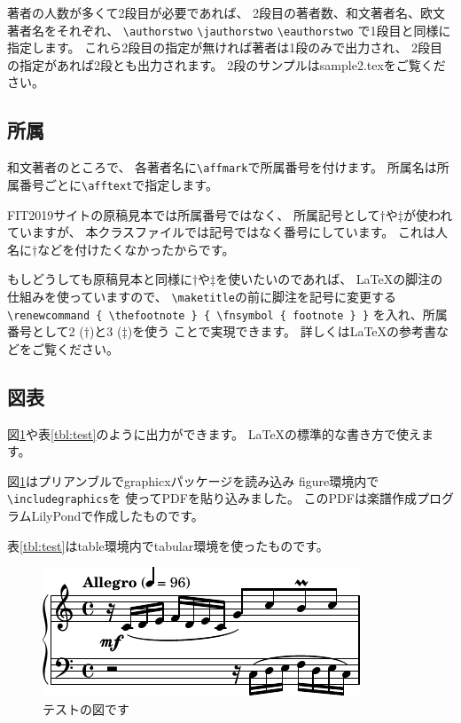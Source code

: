 \documentclass{FITpaper}
\begin{document}
著者の人数が多くて2段目が必要であれば、
2段目の著者数、和文著者名、欧文著者名をそれぞれ、
\texttt{\textbackslash authorstwo}
\texttt{\textbackslash jauthorstwo}
\texttt{\textbackslash eauthorstwo}
で1段目と同様に指定します。
これら2段目の指定が無ければ著者は1段のみで出力され、
2段目の指定があれば2段とも出力されます。
2段のサンプルはsample2.texをご覧ください。

\subsection{所属}

和文著者のところで、
各著者名に\texttt{\textbackslash af\mbox{}fmark}で所属番号を付けます。
所属名は所属番号ごとに\texttt{\textbackslash af\mbox{}ftext}で指定します。

FIT2019サイトの原稿見本では所属番号ではなく、
所属記号として$\dag$や$\ddag$が使われていますが、
本クラスファイルでは記号ではなく番号にしています。
これは人名に$\dag$などを付けたくなかったからです。

もしどうしても原稿見本と同様に$\dag$や$\ddag$を使いたいのであれば、
\LaTeX の脚注の仕組みを使っていますので、
\texttt{\textbackslash maketitle}の前に脚注を記号に変更する
\texttt{\textbackslash renewcommand \{
  \textbackslash thefootnote \} \{
  \textbackslash fnsymbol \{ footnote \} \}}
を入れ、所属番号として2 ($\dag$)と3 ($\ddag$)を使う
ことで実現できます。
詳しくは\LaTeX の参考書などをご覧ください。

\subsection{図表}

図\ref{fig:test}や表\ref{tbl:test}のように出力ができます。
\LaTeX の標準的な書き方で使えます。

図\ref{fig:test}はプリアンブルでgraphicxパッケージを読み込み
figure環境内で\texttt{\textbackslash includegraphics}を
使ってPDFを貼り込みました。
このPDFは楽譜作成プログラムLilyPond\cite{lilypond}で作成したものです。

表\ref{tbl:test}はtable環境内でtabular環境を使ったものです。

\begin{figure}
  \centering
  \includegraphics{invention1}
  \caption{テストの図です}
  \label{fig:test}
\end{figure}
\end{document}
